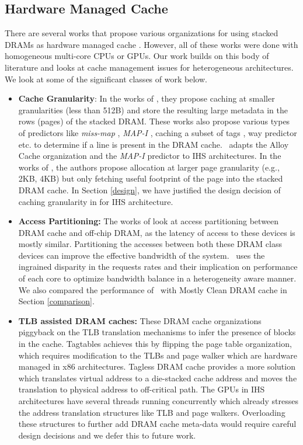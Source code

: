 \subsection{Hardware Managed Cache}
There are several works that propose various organizations for using stacked DRAMs as hardware managed cache \cite{loh-hill,alloy,bimodal,atcache,mostly-clean,bear,tagless-dramcache}. However, all of these works were done with homogeneous multi-core CPUs or GPUs. Our work builds on this body of literature and looks at cache management issues for heterogeneous architectures. We look at some of the significant classes of work below.
\begin{itemize}
\item \textbf{Cache Granularity}: In the works of \cite{loh-hill,alloy,atcache,bimodal}, they propose caching at smaller granularities (less than 512B) and store the resulting large metadata in the rows (pages) of the stacked DRAM. These works also propose various types of predictors like \textit{miss-map} \cite{loh-hill}, \textit{MAP-I} \cite{alloy}, caching a subset of tags \cite{atcache}, way predictor \cite{bimodal} etc. to determine if a line is present in the DRAM cache. \cachename\ adapts the Alloy Cache organization and the \textit{MAP-I} predictor \cite{alloy} to IHS architectures. In the works of \cite{footprint}, the authors propose allocation at larger page granularity (e.g., 2KB, 4KB) but only fetching useful footprint of the page into the stacked DRAM cache. In Section \ref{design}, we have justified the design decision of caching granularity in \cachename for IHS architecture.

\item \textbf{Access Partitioning:} The works of \cite{mostly-clean,mainak-hpca,micro-refresh,bear} look at access partitioning between DRAM cache and off-chip DRAM, as the latency of access to these devices is mostly similar. Partitioning the accesses between both these DRAM class devices can improve the effective bandwidth of the system. \cachename\ uses the ingrained disparity in the requests rates and their implication on performance of each core to optimize bandwidth balance in a heterogeneity aware manner. We also compared the performance of \cachename\ with Mostly Clean DRAM cache \cite{mostly-clean} in Section \ref{comparison}.

\item \textbf{TLB assisted DRAM caches:} These DRAM cache organizations piggyback on the TLB translation mechanisms to infer the presence of blocks in the cache. Tagtables \cite{tag-tables} achieves this by flipping the page table organization, which requires modification to the TLBs and page walker which are hardware managed in x86 architectures. Tagless DRAM cache \cite{tagless-dramcache} provides a more solution which translates virtual address to a die-stacked cache address and moves the translation to physical address to off-critical path. The GPUs in IHS architectures have several threads running concurrently which already stresses the address translation structures like TLB and page walkers. Overloading these structures to further add DRAM cache meta-data would require careful design decisions and we defer this to future work.

\end{itemize}
